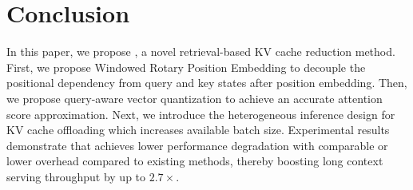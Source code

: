 \section{Conclusion}
In this paper, we propose {\name}, a novel retrieval-based KV cache reduction method.
First, we propose Windowed Rotary Position Embedding to decouple the positional dependency from query and key states after position embedding.
Then, we propose query-aware vector quantization to achieve an accurate attention score approximation.
Next, we introduce the heterogeneous inference design for KV cache offloading
which increases available batch size.
Experimental results demonstrate that {\name} achieves lower performance degradation with comparable or lower overhead compared to existing methods, thereby boosting long context serving throughput by up to \(2.7 \times\).
